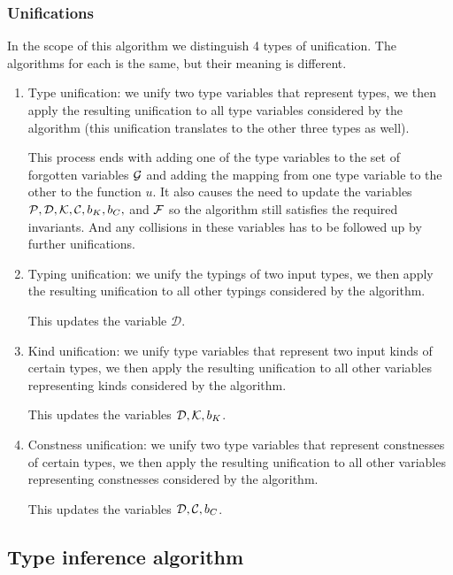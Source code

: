 \subsubsection{Unifications}

In the scope of this algorithm we distinguish 4 types of unification. The algorithms for each is the same, but their meaning is different.

\begin{enumerate}
    \item Type unification: we unify two type variables that represent types, we then apply the resulting unification to all type variables considered by the algorithm (this unification translates to the other three types as well). \label{tUni}

    This process ends with adding one of the type variables to the set of forgotten variables $\mathcal G$ and adding the mapping from one type variable to the other to the function $u$. It also causes the need to update the variables $\mathcal P, \mathcal D, \mathcal K, \mathcal C, b_K, b_C,$ and $\mathcal F$ so the algorithm still satisfies the required invariants. And any collisions in these variables has to be followed up by further unifications.

    \item Typing unification: we unify the typings of two input types, we then apply the resulting unification to all other typings considered by the algorithm.  \label{tyUni}

    This updates the variable $\mathcal D$.

    \item Kind unification: we unify type variables that represent two input kinds of certain types, we then apply the resulting unification to all other variables representing kinds considered by the algorithm. \label{kUni}

    This updates the variables $\mathcal D, \mathcal K, b_K$.

    \item Constness unification: we unify two type variables that represent constnesses of certain types, we then apply the resulting unification to all other variables representing constnesses considered by the algorithm. \label{cUni}

    This updates the variables $\mathcal D, \mathcal C, b_C$.
\end{enumerate}

\subsection{Type inference algorithm}

